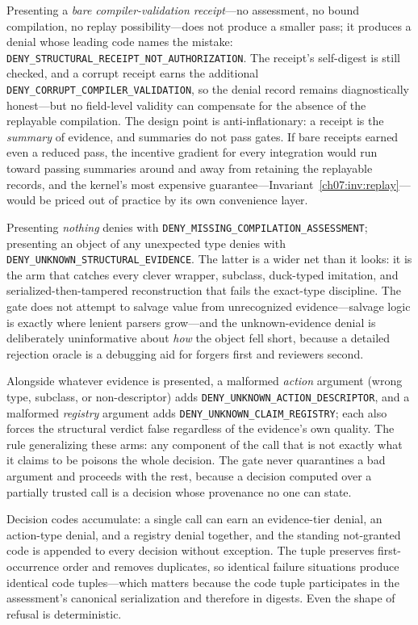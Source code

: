 Presenting a \emph{bare compiler-validation receipt}---no assessment, no bound compilation, no replay possibility---does not produce a smaller pass; it produces a denial whose leading code names the mistake: \texttt{DENY\_STRUCTURAL\_RECEIPT\_NOT\_AUTHORIZATION}. The receipt's self-digest is still checked, and a corrupt receipt earns the additional \texttt{DENY\_CORRUPT\_COMPILER\_VALIDATION}, so the denial record remains diagnostically honest---but no field-level validity can compensate for the absence of the replayable compilation. The design point is anti-inflationary: a receipt is the \emph{summary} of evidence, and summaries do not pass gates. If bare receipts earned even a reduced pass, the incentive gradient for every integration would run toward passing summaries around and away from retaining the replayable records, and the kernel's most expensive guarantee---Invariant~\ref{ch07:inv:replay}---would be priced out of practice by its own convenience layer.

Presenting \emph{nothing} denies with \texttt{DENY\_MISSING\_COMPILATION\_ASSESSMENT}; presenting an object of any unexpected type denies with \texttt{DENY\_UNKNOWN\_STRUCTURAL\_EVIDENCE}. The latter is a wider net than it looks: it is the arm that catches every clever wrapper, subclass, duck-typed imitation, and serialized-then-tampered reconstruction that fails the exact-type discipline. The gate does not attempt to salvage value from unrecognized evidence---salvage logic is exactly where lenient parsers grow---and the unknown-evidence denial is deliberately uninformative about \emph{how} the object fell short, because a detailed rejection oracle is a debugging aid for forgers first and reviewers second.

Alongside whatever evidence is presented, a malformed \emph{action} argument (wrong type, subclass, or non-descriptor) adds \texttt{DENY\_UNKNOWN\_ACTION\_DESCRIPTOR}, and a malformed \emph{registry} argument adds \texttt{DENY\_UNKNOWN\_CLAIM\_REGISTRY}; each also forces the structural verdict false regardless of the evidence's own quality. The rule generalizing these arms: any component of the call that is not exactly what it claims to be poisons the whole decision. The gate never quarantines a bad argument and proceeds with the rest, because a decision computed over a partially trusted call is a decision whose provenance no one can state.

\begin{remark}\label{ch09:rem:codes}
Decision codes accumulate: a single call can earn an evidence-tier denial, an action-type denial, and a registry denial together, and the standing not-granted code is appended to every decision without exception. The tuple preserves first-occurrence order and removes duplicates, so identical failure situations produce identical code tuples---which matters because the code tuple participates in the assessment's canonical serialization and therefore in digests. Even the shape of refusal is deterministic.
\end{remark}

